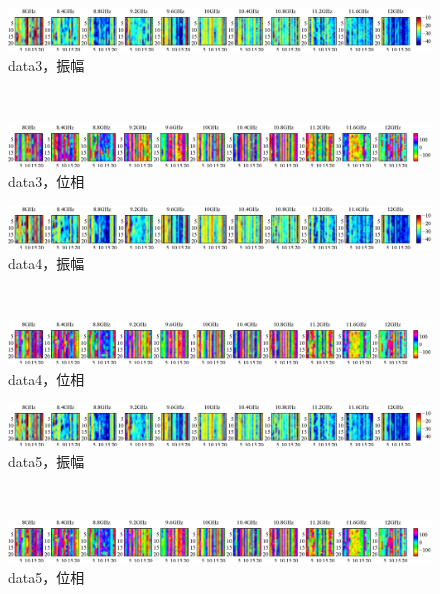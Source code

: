 ﻿\documentclass[12pt,oneside]{jsbook}
\begin{document}
\begin{figure}[bhtp]
 \begin{center}
     \begin{minipage}[c]{\hsize}
\includegraphics[width = \hsize ]{20150204_mine3_raw_a.eps}
\centering\textmd{data3，振幅}
  \end{minipage}
\\
     \begin{minipage}[c]{\hsize}
\includegraphics[width =\hsize ]{20150204_mine3_raw_p.eps}
\centering\textmd{data3，位相}
  \end{minipage}
\end{center}
\end{figure}
\begin{figure}[bhtp]
 \begin{center}
     \begin{minipage}[c]{\hsize}
\includegraphics[width = \hsize ]{20150204_mine4_raw_a.eps}
\centering\textmd{data4，振幅}
  \end{minipage}
\\
     \begin{minipage}[c]{\hsize}
\includegraphics[width =\hsize ]{20150204_mine4_raw_p.eps}
\centering\textmd{data4，位相}
  \end{minipage}
\end{center}
\end{figure}
\begin{figure}[bhtp]
 \begin{center}
     \begin{minipage}[c]{\hsize}
\includegraphics[width = \hsize ]{20150204_mine5_raw_a.eps}
\centering\textmd{data5，振幅}
  \end{minipage}
\\
     \begin{minipage}[c]{\hsize}
\includegraphics[width =\hsize ]{20150204_mine5_raw_p.eps}
\centering\textmd{data5，位相}
  \end{minipage}
\end{center}
\end{figure}
\end{document}
